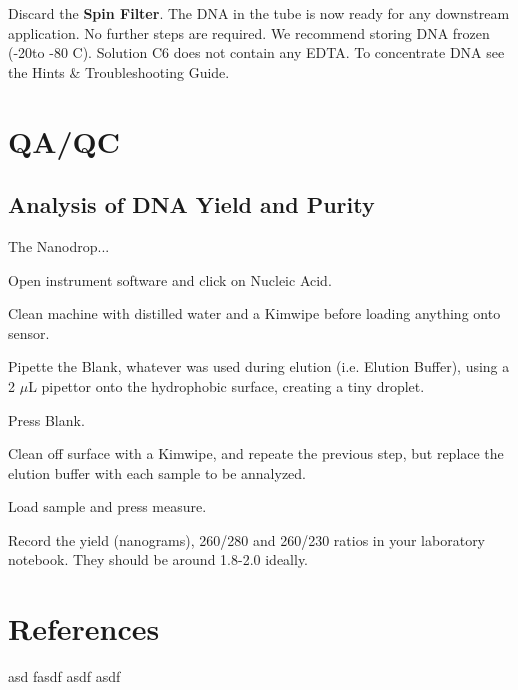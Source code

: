 \documentclass[12pt]{../SOP3_alpha}
\begin{document}
\NP Discard the \textbf{Spin Filter}. The DNA in the tube is now ready for any downstream application. No further steps are required. We recommend storing DNA frozen (-20\degree to -80 \degree C). Solution C6 does not contain any EDTA. To concentrate DNA see the Hints \& Troubleshooting Guide.

\section{QA/QC}

\subsection*{Analysis of DNA Yield and Purity}

\NP The Nanodrop...

\NP Open instrument software and click on Nucleic Acid.

\NP Clean machine with distilled water and a Kimwipe before loading anything onto sensor. 

\NP Pipette the Blank, whatever was used during elution (i.e. Elution Buffer), using a 2 $\mu$L pipettor onto the hydrophobic surface, creating a tiny droplet.

\NP Press Blank.

\NP Clean off surface with a Kimwipe, and repeate the previous step, but replace the elution buffer with each sample to be annalyzed.

\NP Load sample and press measure.

\NP Record the yield (nanograms), 260/280 and 260/230 ratios in your laboratory notebook. They should be around 1.8-2.0 ideally. 


\section{References}

\NP asd fasdf asdf asdf 
\end{document}
